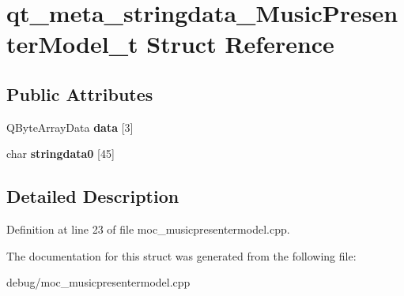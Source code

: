 \hypertarget{structqt__meta__stringdata___music_presenter_model__t}{}\section{qt\+\_\+meta\+\_\+stringdata\+\_\+\+Music\+Presenter\+Model\+\_\+t Struct Reference}
\label{structqt__meta__stringdata___music_presenter_model__t}
\subsection*{Public Attributes}
\begin{DoxyCompactItemize}
\item 
\mbox{\label{structqt__meta__stringdata___music_presenter_model__t_ac97e066c7c985076c1b76e6f6bbde490}} 
Q\+Byte\+Array\+Data {\bfseries data} \mbox{[}3\mbox{]}
\item 
\mbox{\label{structqt__meta__stringdata___music_presenter_model__t_a69fe0ab1bbb8d3fc15641ad7d7900275}} 
char {\bfseries stringdata0} \mbox{[}45\mbox{]}
\end{DoxyCompactItemize}


\subsection{Detailed Description}


Definition at line 23 of file moc\+\_\+musicpresentermodel.\+cpp.



The documentation for this struct was generated from the following file\+:\begin{DoxyCompactItemize}
\item 
debug/moc\+\_\+musicpresentermodel.\+cpp\end{DoxyCompactItemize}
